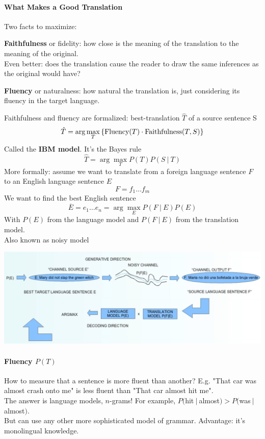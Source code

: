 \documentclass[10pt]{report}
\begin{document}
\paragraph{What Makes a Good Translation} Two facts to maximize:
\begin{list}{}{}
	\item \textbf{Faithfulness} or fidelity: how close is the meaning of the translation to the meaning of the original.\\
	Even better: does the translation cause the reader to draw the same inferences as the original would have?
	\item \textbf{Fluency} or naturalness: how natural the translation is, just considering its fluency in the target language.
\end{list}
Faithfulness and fluency are formalized: best-translation $\hat{T}$ of a source sentence S
$$\hat{T}=\arg\max_T \left\{\hbox{Fluency}(T)\cdot\hbox{Faithfulness}(T,S)\right\}$$
Called the \textbf{IBM model}. It's the Bayes rule
$$\hat{T} = \arg\max_T P(T)P(S\:|\:T)$$
More formally: assume we want to translate from a foreign language sentence $F$ to an English language sentence $E$
$$F = f_1 \ldots f_m$$
We want to find the best English sentence
$$\overline{E} = e_1\ldots e_n = \arg\max_E P(F\:|\:E)P(E)$$
With $P(E)$ from the language model and $P(F\:|\:E)$ from the translation model.\\
Also known as noisy model
\begin{center}
	\includegraphics[scale=0.5]{42.png}
\end{center}
\paragraph{Fluency $P(T)$} How to measure that a sentence is more fluent than another? E.g. "That car was almost crash onto me" is less fluent than "That car almost hit me".\\
The answer is language models, $n$-grams! For example, $P($hit$\:|\:$almost$)>P($was$\:|\:$almost$)$.\\
But can use any other more sophisticated model of grammar. Advantage: it's monolingual knowledge.
\end{document}
